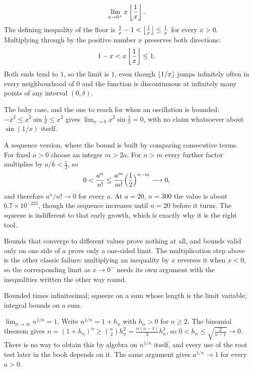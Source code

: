 \begin{worked}
\[\lim_{x\to0^{+}}x\left\lfloor \frac1x\right\rfloor.\]
The defining inequality of the floor is $\tfrac1x-1<\left\lfloor \tfrac1x\right\rfloor\leq\tfrac1x$ for every $x>0$. Multiplying through by the positive number $x$ preserves both directions:
\[1-x<x\left\lfloor \frac1x\right\rfloor\leq1 .\]
Both ends tend to $1$, so the limit is $1$, even though $\left\lfloor 1/x\right\rfloor$ jumps infinitely often in every neighbourhood of $0$ and the function is discontinuous at infinitely many points of any interval $(0,\delta)$.

The baby case, and the one to reach for when an oscillation is bounded: $-x^{2}\leq x^{2}\sin\tfrac1x\leq x^{2}$ gives $\displaystyle\lim_{x\to0}x^{2}\sin\tfrac1x=0$, with no claim whatsoever about $\sin(1/x)$ itself.

A sequence version, where the bound is built by comparing consecutive terms. For fixed $a>0$ choose an integer $m>2a$. For $n>m$ every further factor multiplies by $a/k<\tfrac12$, so
\[0<\frac{a^{n}}{n!}\leq\frac{a^{m}}{m!}\Bigl(\frac12\Bigr)^{n-m}\longrightarrow0,\]
and therefore $a^{n}/n!\to0$ for every $a$. At $a=20$, $n=300$ the value is about $6.7\times10^{-225}$, though the sequence increases until $n=20$ before it turns. The squeeze is indifferent to that early growth, which is exactly why it is the right tool.
\end{worked}

\begin{trap}
Bounds that converge to different values prove nothing at all, and bounds valid only on one side of $a$ prove only a one-sided limit. The multiplication step above is the other classic failure: multiplying an inequality by $x$ reverses it when $x<0$, so the corresponding limit as $x\to0^{-}$ needs its own argument with the inequalities written the other way round.
\end{trap}

\begin{seealsob}Bounded times infinitesimal; squeeze on a sum whose length is the limit variable; integral bounds on a sum.\end{seealsob}

\begin{keynote}
$\displaystyle\lim_{n\to\infty}n^{1/n}=1$. Write $n^{1/n}=1+h_{n}$ with $h_{n}>0$ for $n\geq2$. The binomial theorem gives $n=(1+h_{n})^{n}\geq\binom{n}{2}h_{n}^{2}=\tfrac{n(n-1)}{2}h_{n}^{2}$, so $0<h_{n}\leq\sqrt{\tfrac{2}{n-1}}\to0$. There is no way to obtain this by algebra on $n^{1/n}$ itself, and every use of the root test later in the book depends on it. The same argument gives $a^{1/n}\to1$ for every $a>0$.
\end{keynote}


